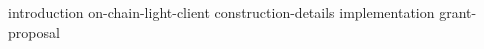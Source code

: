 {introduction}
{on-chain-light-client}
{construction-details}
{implementation}
{grant-proposal}





